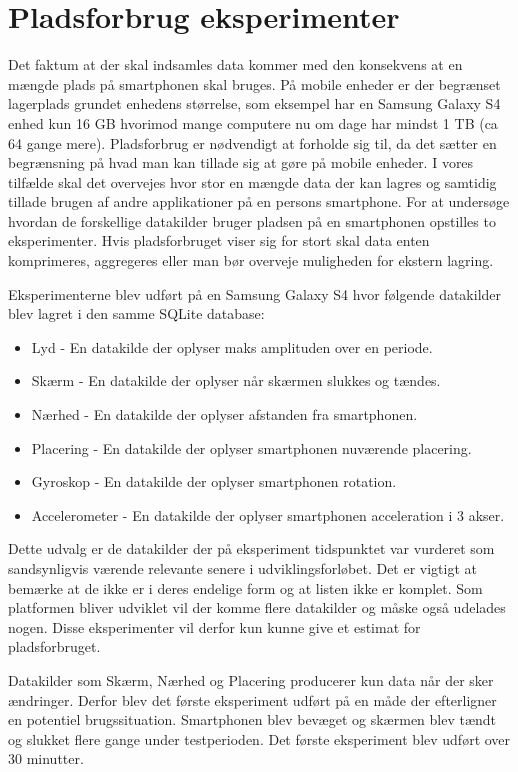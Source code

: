 \section{Pladsforbrug eksperimenter}\label{eksperimenter}
Det faktum at der skal indsamles data kommer med den konsekvens at en mængde plads på smartphonen skal bruges.
På mobile enheder er der begrænset lagerplads grundet enhedens størrelse, som eksempel har en Samsung Galaxy S4 enhed kun 16 GB hvorimod mange computere nu om dage har mindst 1 TB (ca 64 gange mere).
Pladsforbrug er nødvendigt at forholde sig til, da det sætter en begrænsning på hvad man kan tillade sig at gøre på mobile enheder.
I vores tilfælde skal det overvejes hvor stor en mængde data der kan lagres og samtidig tillade brugen af andre applikationer på en persons smartphone.
For at undersøge hvordan de forskellige datakilder bruger pladsen på en smartphonen opstilles to eksperimenter.
Hvis pladsforbruget viser sig for stort skal data enten komprimeres, aggregeres eller man bør overveje muligheden for ekstern lagring.

Eksperimenterne blev udført på en Samsung Galaxy S4 hvor følgende datakilder blev lagret i den samme SQLite database:

\begin{itemize}
	\item Lyd - En datakilde der oplyser maks amplituden over en periode.
	\item Skærm - En datakilde der oplyser når skærmen slukkes og tændes.
	\item Nærhed - En datakilde der oplyser afstanden fra smartphonen.
	\item Placering - En datakilde der oplyser smartphonen nuværende placering.
	\item Gyroskop - En datakilde der oplyser smartphonen rotation.
	\item Accelerometer - En datakilde der oplyser smartphonen acceleration i 3 akser.
\end{itemize}

Dette udvalg er de datakilder der på eksperiment tidspunktet var vurderet som sandsynligvis værende relevante senere i udviklingsforløbet.
Det er vigtigt at bemærke at de ikke er i deres endelige form og at listen ikke er komplet.
Som platformen bliver udviklet vil der komme flere datakilder og måske også udelades nogen.
Disse eksperimenter vil derfor kun kunne give et estimat for pladsforbruget.

Datakilder som Skærm, Nærhed og Placering producerer kun data når der sker ændringer. 
Derfor blev det første eksperiment udført på en måde der efterligner en potentiel brugssituation. 
Smartphonen blev bevæget og skærmen blev tændt og slukket flere gange under testperioden.
Det første eksperiment blev udført over 30 minutter.

